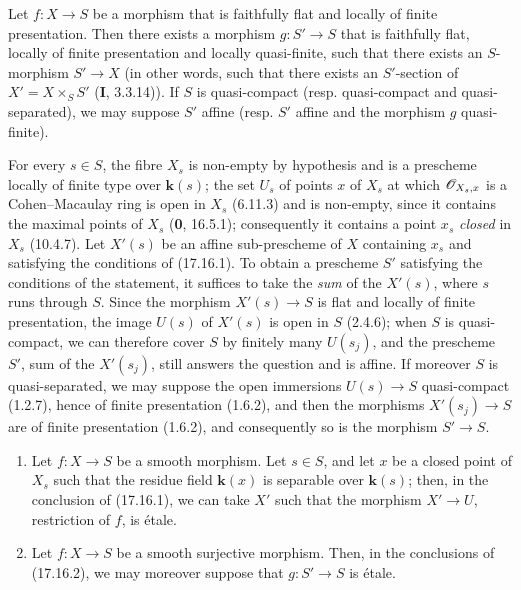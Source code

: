 \begin{corollary}[17.16.2]
\label{IV.17.16.2}
Let $f:X\to S$ be a morphism that is faithfully flat and locally of finite presentation. Then there exists a morphism $g:S'\to S$ that is faithfully flat, locally of finite presentation and \textup{locally quasi-finite}, such that there exists an $S$-morphism $S'\to X$ \textup{(in other words, such that there exists an} $S'$-section \textup{of} $X'=X\times_S S'$ \textup{(\textbf{I}, 3.3.14))}. If $S$ is quasi-compact \textup{(resp.} quasi-compact and quasi-separated\textup{)}, we may suppose $S'$ affine \textup{(resp.} $S'$ affine and the morphism $g$ quasi-finite\textup{)}.
\end{corollary}

For every $s\in S$, the fibre $X_s$ is non-empty by hypothesis and is a prescheme locally of finite type over $\boldsymbol{k}(s)$; the set $U_s$ of points $x$ of $X_s$ at which $\mathscr{O}_{X_s,x}$ is a Cohen--Macaulay ring is open in $X_s$ (6.11.3) and is non-empty, since it contains the maximal points of $X_s$ (\textbf{0}, 16.5.1); consequently it contains a point $x_s$ \emph{closed} in $X_s$ (10.4.7). Let $X'(s)$ be an affine sub-prescheme of $X$ containing $x_s$ and satisfying the conditions of (17.16.1). To obtain a prescheme $S'$ satisfying the conditions of the statement, it suffices to take the \emph{sum} of the $X'(s)$, where $s$ runs through $S$. Since the morphism $X'(s)\to S$ is flat and locally of finite presentation, the image $U(s)$ of $X'(s)$ is open in $S$ (2.4.6); when $S$ is quasi-compact, we can therefore cover $S$ by finitely many $U(s_j)$, and the prescheme $S'$, sum of the $X'(s_j)$, still answers the question and is affine. If moreover $S$ is quasi-separated, we may suppose the open immersions $U(s)\to S$ quasi-compact (1.2.7), hence of finite presentation (1.6.2), and then the morphisms $X'(s_j)\to S$ are of finite presentation (1.6.2), and consequently so is the morphism $S'\to S$.

\begin{corollary}[17.16.3]
\label{IV.17.16.3}
\begin{enumerate}
  \item[\textup{(i)}] Let $f:X\to S$ be a smooth morphism. Let $s\in S$, and let $x$ be a closed point of $X_s$ such that the residue field $\boldsymbol{k}(x)$ is separable over $\boldsymbol{k}(s)$; then, in the conclusion of (17.16.1), we can take $X'$ such that the morphism $X'\to U$, restriction of $f$, is étale.
  \item[\textup{(ii)}] Let $f:X\to S$ be a smooth surjective morphism. Then, in the conclusions of \textup{(17.16.2)}, we may moreover suppose that $g:S'\to S$ is étale.
\end{enumerate}
\end{corollary}

